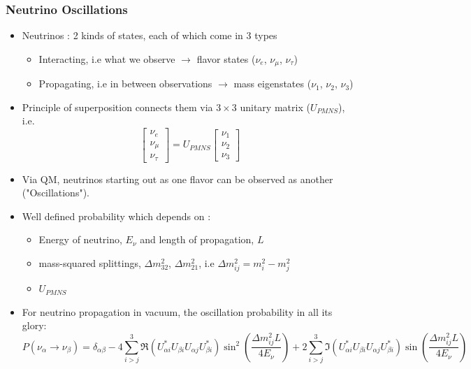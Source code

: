 \documentclass[9pt, aspectratio=169]{beamer}
\begin{document}
\begin{frame}
  \frametitle{Neutrino Oscillations}
  \begin{itemize}
    \item Neutrinos : 2 kinds of states, each of which come in 3 types 
    \begin{itemize}
      \item Interacting, i.e what we observe $\rightarrow$ flavor states ($\nu_{e}$, $\nu_{\mu}$, $\nu_{\tau}$)
      \item Propagating, i.e in between observations $\rightarrow$ mass eigenstates ($\nu_{1}$, $\nu_{2}$, $\nu_{3}$)
    \end{itemize}
  \item Principle of superposition connects them via $3\times 3$ unitary matrix ($U_{PMNS}$), i.e. 
    \begin{equation*}
      \begin{bmatrix} \nu_e \\ \nu_\mu \\ \nu_\tau \end{bmatrix}
        = U_{PMNS} \begin{bmatrix} \nu_1 \\ \nu_2 \\ \nu_3 \end{bmatrix}
    \end{equation*}
  \item Via QM, neutrinos starting out as one flavor can be observed as another ("Oscillations").
  \item Well defined probability which depends on :
    \begin{itemize}
      \item Energy of neutrino, $E_{\nu}$ and length of propagation, $L$
      \item mass-squared splittings, $\Delta m^2_{32}$, $\Delta m^2_{21}$, i.e  $\Delta m^2_{ij} = m_i^2 - m_j^2$
      \item $U_{PMNS}$
    \end{itemize}
      \bigskip
  \item For neutrino propagation in vacuum, the oscillation probability in all its glory:
  \begin{equation*}
    P(\nu_{\alpha} \rightarrow \nu_{\beta}) =  \delta_{\alpha\beta} - 4\sum_{i>j}^{3}\Re(U_{\alpha i}^{*}U_{\beta i}U_{\alpha j}U_{\beta i}^{*})\sin^{2}(\frac{\Delta m^{2}_{ij}L}{4E_\nu}) + 2\sum_{i>j}^{3}\Im(U_{\alpha i}^{*}U_{\beta i}U_{\alpha j}U_{\beta i}^{*})\sin(\frac{\Delta m^{2}_{ij}L}{4E_\nu})
  \end{equation*}


\end{itemize}
\end{frame}
\end{document}
